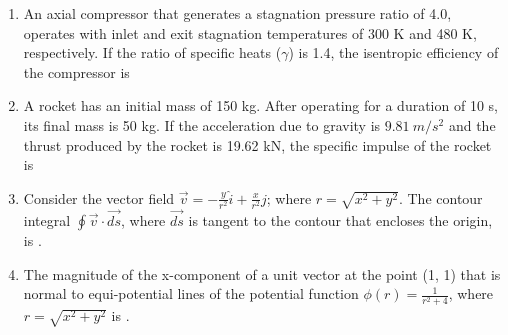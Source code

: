 \documentclass[journal,12pt,onecolumn]{IEEEtran}
\theoremstyle{remark}
\begin{document}
\begin{enumerate}
    \item An axial compressor that generates a stagnation pressure ratio of 4.0, operates with inlet and exit stagnation temperatures of 300 K and 480 K, respectively. If the ratio of specific heats ($\gamma$) is 1.4, the isentropic efficiency of the compressor is
    \hfill{}

    \begin{enumerate}
    \end{enumerate}

    \item A rocket has an initial mass of 150 kg. After operating for a duration of 10 s, its final mass is 50 kg. If the acceleration due to gravity is $9.81~m/s^{2}$ and the thrust produced by the rocket is 19.62 kN, the specific impulse of the rocket is
    \hfill{}

    \begin{enumerate}
    \end{enumerate}

    \item Consider the vector field $\vec{v}=-\frac{y}{r^{2}}\hat{i}+\frac{x}{r^{2}}j$; where $r=\sqrt{x^{2}+y^{2}}$. The contour integral $\oint \vec{v} \cdot \vec{ds}$, where $\vec{ds}$ is tangent to the contour that encloses the origin, is \underline{\hspace{2cm}} .
    \hfill{}

    \item The magnitude of the x-component of a unit vector at the point (1, 1) that is normal to equi-potential lines of the potential function $\phi(r)=\frac{1}{r^{2}+4}$, where $r=\sqrt{x^{2}+y^{2}}$ is \underline{\hspace{2cm}} .
    \hfill{}


\end{enumerate}
\end{document}
